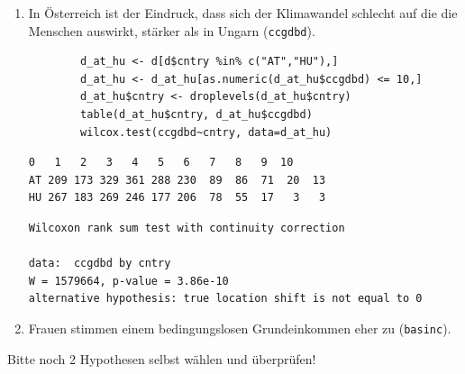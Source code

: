 \documentclass{article}
\begin{document}
\begin{enumerate}
	\item In Österreich ist der Eindruck, dass sich der Klimawandel schlecht auf die die Menschen auswirkt, stärker als in Ungarn (\texttt{ccgdbd}). 
	\begin{lstlisting}
		d_at_hu <- d[d$cntry %in% c("AT","HU"),]
		d_at_hu <- d_at_hu[as.numeric(d_at_hu$ccgdbd) <= 10,]
		d_at_hu$cntry <- droplevels(d_at_hu$cntry)
		table(d_at_hu$cntry, d_at_hu$ccgdbd)
		wilcox.test(ccgdbd~cntry, data=d_at_hu)
	\end{lstlisting}
	\begin{Verbatim}[frame=single]
     0   1   2   3   4   5   6   7   8   9  10
AT 209 173 329 361 288 230  89  86  71  20  13
HU 267 183 269 246 177 206  78  55  17   3   3
	\end{Verbatim}
	\begin{Verbatim}[frame=single]
    Wilcoxon rank sum test with continuity correction

data:  ccgdbd by cntry
W = 1579664, p-value = 3.86e-10
alternative hypothesis: true location shift is not equal to 0
	\end{Verbatim}
	\newpage
	
	\item Frauen stimmen einem bedingungslosen Grundeinkommen eher zu (\texttt{basinc}).
\end{enumerate}
\newpage

Bitte noch 2 Hypothesen selbst wählen und überprüfen!
\end{document}

